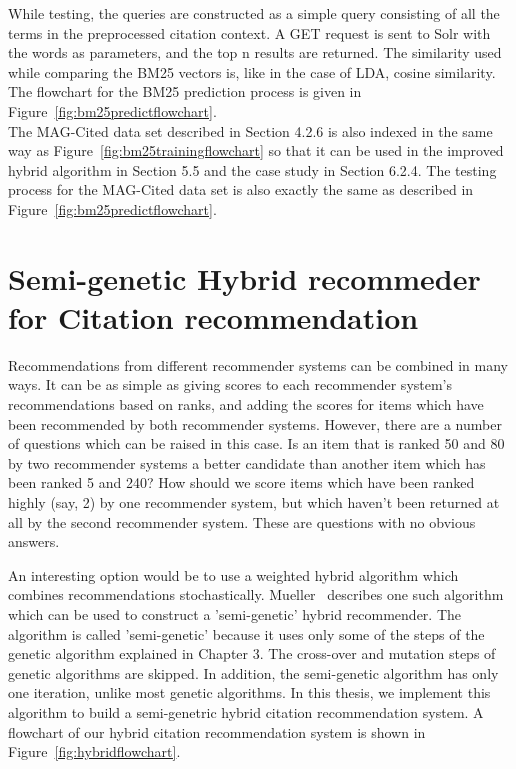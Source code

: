 While testing, the queries are constructed as a simple query consisting of all the terms in the preprocessed citation context. A GET request is sent to Solr with the words as parameters, and the top n results are returned. The similarity used while comparing the BM25 vectors is, like in the case of LDA, cosine similarity. 
The flowchart for the BM25 prediction process is given in Figure~\ref{fig:bm25predictflowchart}.\\
The MAG-Cited data set described in Section 4.2.6 is also indexed in the same way as Figure~\ref{fig:bm25trainingflowchart} so that it can be used in the improved hybrid algorithm in Section 5.5 and the case study in Section 6.2.4. The testing process for the MAG-Cited data set is also exactly the same as described in Figure~\ref{fig:bm25predictflowchart}.

\section{Semi-genetic Hybrid recommeder for Citation recommendation}
Recommendations from different recommender systems can be combined in many ways. It can be as simple as giving scores to each recommender system's recommendations based on ranks, and adding the scores for items which have been recommended by both recommender systems. However, there are a number of questions which can be raised in this case. Is an item that is ranked 50 and 80 by two recommender systems a better candidate than another item which has been ranked 5 and 240? How should we score items which have been ranked highly (say, 2) by one recommender system, but which haven't been returned at all by the second recommender system. These are questions with no obvious answers.

An interesting option would be to use a weighted hybrid algorithm which combines recommendations stochastically.  Mueller~\cite{Mueller17} describes one such algorithm which can be used to construct a 'semi-genetic' hybrid recommender. The algorithm is called 'semi-genetic' because it uses only some of the steps of the genetic algorithm explained in Chapter 3. The cross-over and mutation steps of genetic algorithms are skipped. In addition, the semi-genetic algorithm has only one iteration, unlike most genetic algorithms. 
In this thesis, we implement this algorithm to build a semi-genetric hybrid citation recommendation system. A flowchart of our hybrid citation recommendation system is shown in Figure~\ref{fig:hybridflowchart}.

